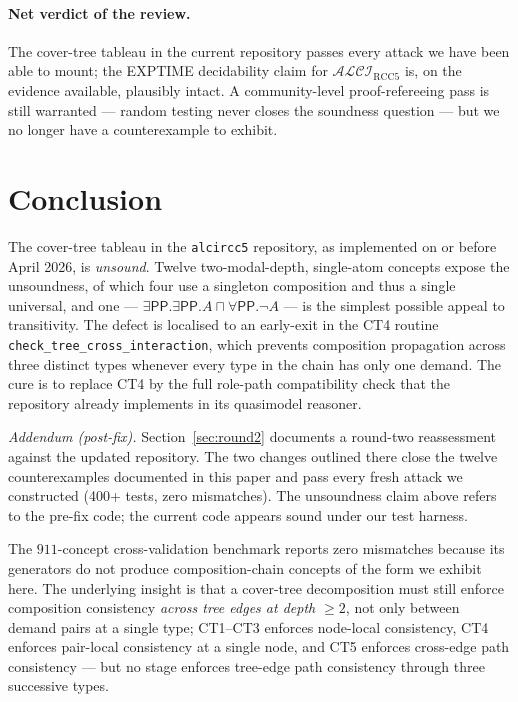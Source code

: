 \documentclass[]{ceurart}
\newcommand{\ALCI}{\mathcal{ALCI}}
\newcommand{\ALCIRCC}[1]{\ALCI_{\mathrm{RCC}#1}}
\newcommand{\PP}{\mathsf{PP}}
\theoremstyle{definition}
\theoremstyle{remark}
\begin{document}
\paragraph{Net verdict of the review.}
The cover-tree tableau in the current repository passes every attack
we have been able to mount; the EXPTIME decidability claim for
$\ALCIRCC{5}$ is, on the evidence available, plausibly intact. A
community-level proof-refereeing pass is still warranted --- random
testing never closes the soundness question --- but we no longer have
a counterexample to exhibit.

\section{Conclusion}
\label{sec:conclusion}

The cover-tree tableau in the \texttt{alcircc5} repository, as
implemented on or before April 2026, is \emph{unsound}. Twelve
two-modal-depth, single-atom concepts expose the unsoundness, of which
four use a singleton composition and thus a single universal, and one
--- $\exists \PP . \exists \PP . A \sqcap \forall \PP . \neg A$
--- is the simplest possible appeal to transitivity.  The defect is
localised to an early-exit in the CT4 routine
\verb|check_tree_cross_interaction|, which prevents composition
propagation across three distinct types whenever every type in the
chain has only one demand. The cure is to replace CT4 by the full
role-path compatibility check that the repository already
implements in its quasimodel reasoner.

\emph{Addendum (post-fix).} Section~\ref{sec:round2} documents a
round-two reassessment against the updated repository. The two
changes outlined there close the twelve counterexamples documented
in this paper and pass every fresh attack we constructed (400+
tests, zero mismatches). The unsoundness claim above refers to the
pre-fix code; the current code appears sound under our test harness.

The $911$-concept cross-validation benchmark reports zero mismatches
because its generators do not produce composition-chain concepts of
the form we exhibit here. The underlying insight is that a
cover-tree decomposition must still enforce composition consistency
\emph{across tree edges at depth $\geq 2$}, not only between demand
pairs at a single type; CT1--CT3 enforces node-local consistency,
CT4 enforces pair-local consistency at a single node, and CT5
enforces cross-edge path consistency --- but no stage enforces
tree-edge path consistency through three successive types.
\end{document}
